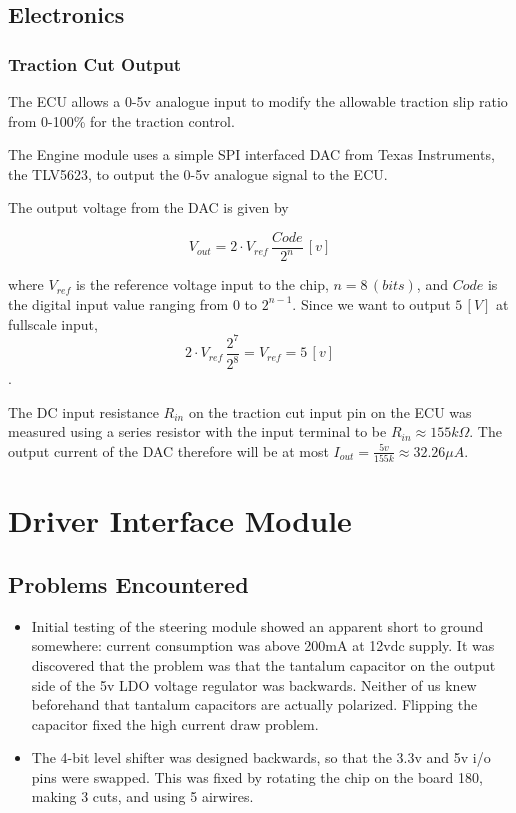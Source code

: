 \documentclass[a4paper,10pt]{scrreprt}
\begin{document}
\section{Electronics}

\subsection{Traction Cut Output}

The ECU allows a 0-5v analogue input to modify the allowable traction slip ratio from 0-100\% for the traction control.

The Engine module uses a simple SPI interfaced DAC from Texas Instruments, the TLV5623, to output the 0-5v analogue signal to the ECU.

The output voltage from the DAC is given by 

  \begin{equation}
    V_{out}=2\cdot{V_{ref}}\,\frac{Code}{2^n}\,[v]
  \end{equation} 

where $V_{ref}$ is the reference voltage input to the chip, $n=8\,(bits)$, and $Code$ is the digital input value ranging from $0$ to $2^{n-1}$. Since we want to output $5\,[V]$ at fullscale input,
  \begin{equation}
    2\cdot{V_{ref}}\,\frac{2^7}{2^8}=V_{ref}=5\,[v]
  \end{equation}.

The DC input resistance $R_{in}$ on the traction cut input pin on the ECU was measured using a series resistor with the input terminal to be $R_{in} \approx 155k \Omega$. The output current of the DAC therefore will be at most $I_{out}=\frac{5v}{155k} \approx 32.26 \mu A$.

\chapter{Driver Interface Module}
\label{chap:driver}

\section{Problems Encountered}

\begin{itemize}
 \item Initial testing of the steering module showed an apparent short to ground somewhere: current consumption was above 200mA at 12vdc supply. It was discovered that the problem was that the tantalum capacitor on the output side of the 5v LDO voltage regulator was backwards. Neither of us knew beforehand that tantalum capacitors are actually polarized. Flipping the capacitor fixed the high current draw problem.

 \item The 4-bit level shifter was designed backwards, so that the 3.3v and 5v i/o pins were swapped. This was fixed by rotating the chip on the board 180\textdegree, making 3 cuts, and  using 5 airwires.
\end{itemize}
\end{document}
